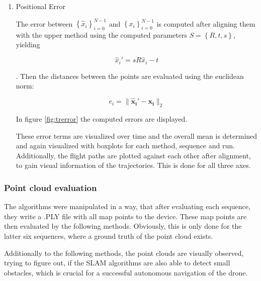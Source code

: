 \begin{enumerate}
	\item{Positional Error}
	
	The error between $\left\{{\widehat{x}_i}\right\}_{i=0}^{N-1}$ and $\left\{{x_i}\right\}_{i=0}^{N-1}$ is computed after aligning them 
	with the upper method using the computed parameters $S = \left\{R,t,s\right\}$, yielding
	
	$$ \widehat{x}_i' = sR\widehat{x}_i - t $$
	
	. Then the distances between the points are evaluated using the euclidean norm: 
	
	$$ e_i = \lVert \mathbf{\widehat{x}_i' - x_i} \rVert_2$$
	
	
	In figure \ref{fig:trerror} the computed errors are displayed. 
	
	
	These error terms are visualized over time and the overall mean is determined and again visualized with boxplots for each method, sequence and run.
	Additionally, the flight paths are plotted against each other after alignment, to gain visual information of the trajectories. 
	This is done for all three axes. 

	
	\end{enumerate}
	
\subsubsection{Point cloud evaluation}\label{pceval}

The algorithms were manipulated in a way, that after evaluating each sequence, they write a .PLY file with all map points to 
the device. These map points are then evaluated by the following methods. Obviously, this is only done for the latter six sequences, 
where a ground truth of the point cloud exists. 

Additionally to the following methods, the point clouds are visually observed, 
trying to figure out, if the SLAM algorithms are also able to detect small obstacles, which is crucial for a successful autonomous
 navigation of the drone. 
	
